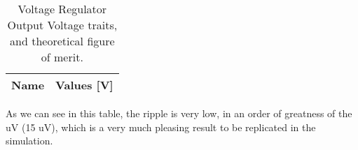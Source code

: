 \begin{table}[h]
  \centering
  \begin{tabular}{|l|r|}
    \hline    
    {\bf Name} & {\bf Values [V]} \\ \hline
     
  \end{tabular}
  \caption{Voltage Regulator Output Voltage traits, and theoretical figure of merit.}
  \label{tab:regula}
\end{table}
As we can see in this table, the ripple is very low, in an order of greatness of the uV (15 uV), which is a very much pleasing result to be replicated in the simulation.
